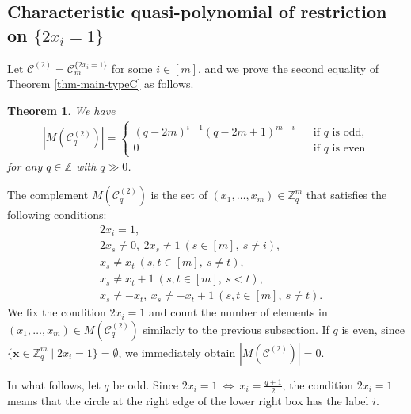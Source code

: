 \documentclass{article}
\theoremstyle{plain}
\newtheorem{Them}{Theorem}[section]
\theoremstyle{definition}
\theoremstyle{remark}
\numberwithin{equation}{section}
\newcommand{\Cc}{\mathcal{C}}
\begin{document}
\subsection{Characteristic quasi-polynomial of restriction on $\{2x_i=1\}$}\label{sec-TypeC-rest-2x_i=1}
Let $\Cc^{(2)}=\mathcal{C}_m^{\{2x_i=1\}}$ for some $i\in [m]$, and we prove the second equality of Theorem \ref{thm-main-typeC} as follows.
\begin{Them}\label{thm-char-quasi-TypeC-2xi=1}
We have
\begin{align*}
\left|M(\Cc_q^{(2)})\right|=
\begin{cases}
(q-2m)^{i-1}(q-2m+1)^{m-i}\;\;\;&\text{if $q$ is odd},\\
0 &\text{if $q$ is even}
\end{cases}
\end{align*}
for any $q\in\mathbb{Z}$ with $q\gg 0$.
\end{Them}
The complement $M(\Cc^{(2)}_q)$ is the set of $(x_1,\dots,x_m)\in\mathbb{Z}_q^m$ that satisfies the following conditions:
\begin{align*}
&2x_i=1,\\
&2x_s\neq 0,\ 2x_s\neq 1\ (s\in [m],\ s\neq i),\\
&x_s\neq x_t\ (s,t\in [m],\ s\neq t),\\
&x_s\neq x_t+1\ (s,t\in [m],\ s<t),\\
&x_s\neq -x_t,\ x_s\neq -x_t+1\ (s,t\in [m],\ s\neq t).
\end{align*}
We fix the condition $2x_i=1$ and count the number of elements in $(x_1,\dots,x_m)\in M(\Cc^{(2)}_q)$ similarly to the previous subsection. %
If $q$ is even, since $\{\bm{x}\in\mathbb{Z}_q^m\mid 2x_i=1\} = \emptyset$, we immediately obtain $\left|M(\Cc^{(2)})\right|=0$.

\medskip
In what follows, let $q$ be odd. 
Since $\displaystyle 2x_i=1\ \Leftrightarrow\ x_i=\frac{q+1}{2}$, the condition $2x_i=1$ means that the circle at the right edge of the lower right box has the label $i$.
\end{document}
